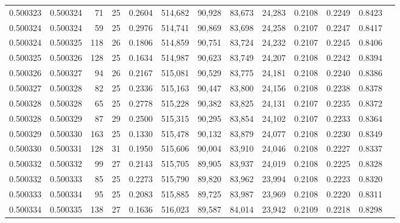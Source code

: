 \begin{tabular}{rrrrrrrrrrrrr}
0.500323 & 0.500324 &  71 &  25 &                                     0.2604 & 514,682 &  90,928 &  83,673 &  24,283 & 0.2108 & 0.2249 & 0.8423 \\
0.500324 & 0.500324 &  59 &  25 &                                     0.2976 & 514,741 &  90,869 &  83,698 &  24,258 & 0.2107 & 0.2247 & 0.8417 \\
0.500324 & 0.500325 & 118 &  26 &                                     0.1806 & 514,859 &  90,751 &  83,724 &  24,232 & 0.2107 & 0.2245 & 0.8406 \\
0.500325 & 0.500326 & 128 &  25 &                                     0.1634 & 514,987 &  90,623 &  83,749 &  24,207 & 0.2108 & 0.2242 & 0.8394 \\
0.500326 & 0.500327 &  94 &  26 &                                     0.2167 & 515,081 &  90,529 &  83,775 &  24,181 & 0.2108 & 0.2240 & 0.8386 \\
0.500327 & 0.500328 &  82 &  25 &                                     0.2336 & 515,163 &  90,447 &  83,800 &  24,156 & 0.2108 & 0.2238 & 0.8378 \\
0.500328 & 0.500328 &  65 &  25 &                                     0.2778 & 515,228 &  90,382 &  83,825 &  24,131 & 0.2107 & 0.2235 & 0.8372 \\
0.500328 & 0.500329 &  87 &  29 &                                     0.2500 & 515,315 &  90,295 &  83,854 &  24,102 & 0.2107 & 0.2233 & 0.8364 \\
0.500329 & 0.500330 & 163 &  25 &                                     0.1330 & 515,478 &  90,132 &  83,879 &  24,077 & 0.2108 & 0.2230 & 0.8349 \\
0.500330 & 0.500331 & 128 &  31 &                                     0.1950 & 515,606 &  90,004 &  83,910 &  24,046 & 0.2108 & 0.2227 & 0.8337 \\
0.500332 & 0.500332 &  99 &  27 &                                     0.2143 & 515,705 &  89,905 &  83,937 &  24,019 & 0.2108 & 0.2225 & 0.8328 \\
0.500332 & 0.500333 &  85 &  25 &                                     0.2273 & 515,790 &  89,820 &  83,962 &  23,994 & 0.2108 & 0.2223 & 0.8320 \\
0.500333 & 0.500334 &  95 &  25 &                                     0.2083 & 515,885 &  89,725 &  83,987 &  23,969 & 0.2108 & 0.2220 & 0.8311 \\
0.500334 & 0.500335 & 138 &  27 &                                     0.1636 & 516,023 &  89,587 &  84,014 &  23,942 & 0.2109 & 0.2218 & 0.8298 \\

\end{tabular}
